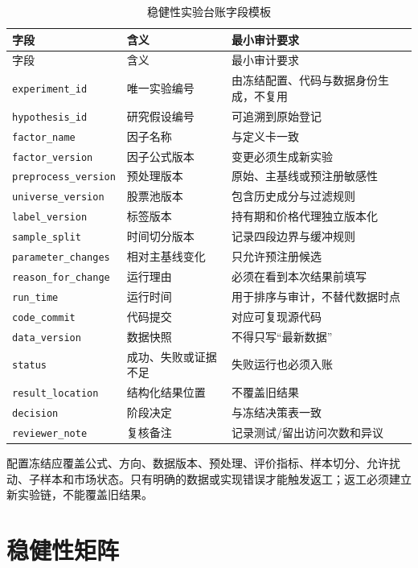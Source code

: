 \begingroup
\small
\begin{longtable}{@{}p{3.7cm}p{4.8cm}p{6.3cm}@{}}
\caption{稳健性实验台账字段模板}\label{tab:ch07-experiment-ledger}\\
\toprule
字段 & 含义 & 最小审计要求 \\
\midrule
\endfirsthead
\toprule
字段 & 含义 & 最小审计要求 \\
\midrule
\endhead
\texttt{experiment\_id} & 唯一实验编号 & 由冻结配置、代码与数据身份生成，不复用 \\
\texttt{hypothesis\_id} & 研究假设编号 & 可追溯到原始登记 \\
\texttt{factor\_name} & 因子名称 & 与定义卡一致 \\
\texttt{factor\_version} & 因子公式版本 & 变更必须生成新实验 \\
\texttt{preprocess\_version} & 预处理版本 & 原始、主基线或预注册敏感性 \\
\texttt{universe\_version} & 股票池版本 & 包含历史成分与过滤规则 \\
\texttt{label\_version} & 标签版本 & 持有期和价格代理独立版本化 \\
\texttt{sample\_split} & 时间切分版本 & 记录四段边界与缓冲规则 \\
\texttt{parameter\_changes} & 相对主基线变化 & 只允许预注册候选 \\
\texttt{reason\_for\_change} & 运行理由 & 必须在看到本次结果前填写 \\
\texttt{run\_time} & 运行时间 & 用于排序与审计，不替代数据时点 \\
\texttt{code\_commit} & 代码提交 & 对应可复现源代码 \\
\texttt{data\_version} & 数据快照 & 不得只写“最新数据” \\
\texttt{status} & 成功、失败或证据不足 & 失败运行也必须入账 \\
\texttt{result\_location} & 结构化结果位置 & 不覆盖旧结果 \\
\texttt{decision} & 阶段决定 & 与冻结决策表一致 \\
\texttt{reviewer\_note} & 复核备注 & 记录测试/留出访问次数和异议 \\
\bottomrule
\end{longtable}
\endgroup

配置冻结应覆盖公式、方向、数据版本、预处理、评价指标、样本切分、允许扰动、子样本和市场状态。只有明确的数据或实现错误才能触发返工；返工必须建立新实验链，不能覆盖旧结果。

\section{稳健性矩阵}

